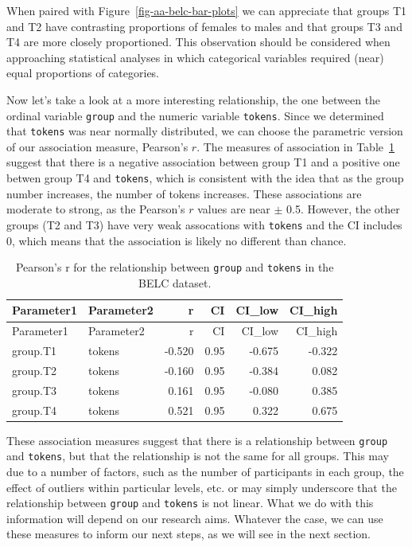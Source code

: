 \documentclass[
  letterpaper,
  DIV=11,
  numbers=noendperiod]{scrreport}
\theoremstyle{definition}
\theoremstyle{remark}
\begin{document}
When paired with Figure~\ref{fig-aa-belc-bar-plots} we can appreciate
that groups T1 and T2 have contrasting proportions of females to males
and that groups T3 and T4 are more closely proportioned. This
observation should be considered when approaching statistical analyses
in which categorical variables required (near) equal proportions of
categories.

Now let's take a look at a more interesting relationship, the one
between the ordinal variable \texttt{group} and the numeric variable
\texttt{tokens}. Since we determined that \texttt{tokens} was near
normally distributed, we can choose the parametric version of our
association measure, Pearson's \(r\). The measures of association in
Table~\ref{tbl-aa-pearson} suggest that there is a negative association
between group T1 and a positive one betwen group T4 and \texttt{tokens},
which is consistent with the idea that as the group number increases,
the number of tokens increases. These associations are moderate to
strong, as the Pearson's \(r\) values are near \(\pm\) 0.5. However, the
other groups (T2 and T3) have very weak assocations with \texttt{tokens}
and the CI includes 0, which means that the association is likely no
different than chance.

\hypertarget{tbl-aa-pearson}{}
\begin{longtable}[]{@{}llrrrr@{}}
\caption{\label{tbl-aa-pearson}Pearson's r for the relationship between
\texttt{group} and \texttt{tokens} in the BELC dataset.}\tabularnewline
\toprule\noalign{}
Parameter1 & Parameter2 & r & CI & CI\_low & CI\_high \\
\midrule\noalign{}
\endfirsthead
\toprule\noalign{}
Parameter1 & Parameter2 & r & CI & CI\_low & CI\_high \\
\midrule\noalign{}
\endhead
\bottomrule\noalign{}
\endlastfoot
group.T1 & tokens & -0.520 & 0.95 & -0.675 & -0.322 \\
group.T2 & tokens & -0.160 & 0.95 & -0.384 & 0.082 \\
group.T3 & tokens & 0.161 & 0.95 & -0.080 & 0.385 \\
group.T4 & tokens & 0.521 & 0.95 & 0.322 & 0.675 \\
\end{longtable}

These association measures suggest that there is a relationship between
\texttt{group} and \texttt{tokens}, but that the relationship is not the
same for all groups. This may due to a number of factors, such as the
number of participants in each group, the effect of outliers within
particular levels, etc. or may simply underscore that the relationship
between \texttt{group} and \texttt{tokens} is not linear. What we do
with this information will depend on our research aims. Whatever the
case, we can use these measures to inform our next steps, as we will see
in the next section.
\end{document}
